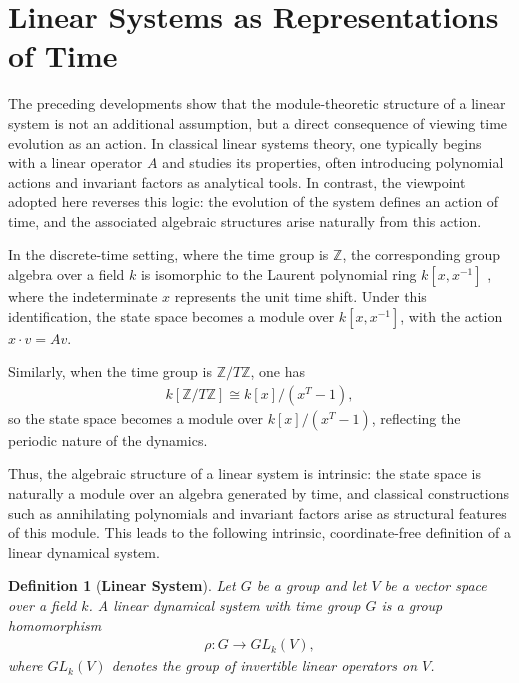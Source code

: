 \documentclass[letterpaper, 9pt, conference]{ieeeconf}
\newtheorem{definition}[theorem]{Definition}
\begin{document}
 




\section{Linear Systems as Representations of Time}\label{sec_linear_system_as_representation}

The preceding developments show that the module-theoretic structure of a linear
system is not an additional assumption, but a direct consequence of viewing time
evolution as an action. In classical linear systems theory, one typically begins
with a linear operator $A$ and studies its properties, often introducing
polynomial actions and invariant factors as analytical tools. In contrast, the
viewpoint adopted here reverses this logic: the evolution of the system defines
an action of time, and the associated algebraic structures arise naturally from
this action.

In the discrete-time setting, where the time group is $\mathbb{Z}$, the
corresponding group algebra over a field $k$ is isomorphic to the Laurent
polynomial ring $k[x,x^{-1}]$ \cite{dummit_foote,lang_algebra_book}, where the
indeterminate $x$ represents the unit time shift. Under this identification,
the state space becomes a module over $k[x,x^{-1}]$, with the action
$x \cdot v = Av$.

Similarly, when the time group is $\mathbb{Z}/T\mathbb{Z}$, one has
\begin{eqnarray}
k[\mathbb{Z}/T\mathbb{Z}] \cong k[x]/(x^T - 1),
\end{eqnarray}
so the state space becomes a module over $k[x]/(x^T - 1)$, reflecting the
periodic nature of the dynamics.

Thus, the algebraic structure of a linear system is intrinsic: the state space
is naturally a module over an algebra generated by time, and classical
constructions such as annihilating polynomials and invariant factors arise as
structural features of this module. This leads to the following intrinsic,
coordinate-free definition of a linear dynamical system.

\begin{definition}[\textbf{Linear System}]
Let $G$ be a group and let $V$ be a vector space over a field $k$. A
\emph{linear dynamical system with time group $G$} is a group homomorphism
\begin{eqnarray}
\rho : G \to GL_k(V),
\end{eqnarray}
where $GL_k(V)$ denotes the group of invertible linear operators on $V$.
\end{definition}
\end{document}
